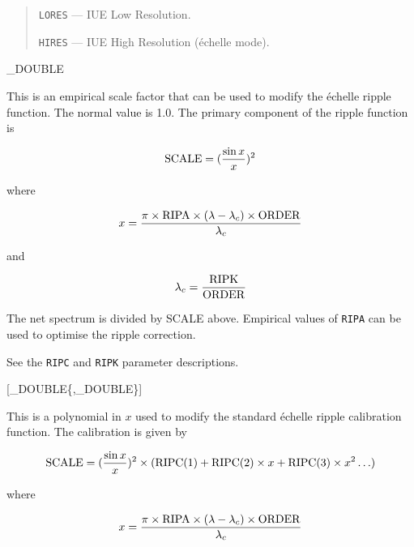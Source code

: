 {{   \begin {quote}
   \begin {description}
      \item {\tt LORES} --- IUE Low Resolution.
      \item {\tt HIRES} --- IUE High Resolution (\'{e}chelle mode).
   \end {description}
   \end {quote}
}

{
   \_DOUBLE
}{
   This is an empirical scale factor that can be used to modify the
   \'{e}chelle ripple function.
   The normal value is 1.0.
   The primary component of the ripple function is

   \begin {equation}
      {\rm SCALE} = (\frac{\sin x}{x})^2
   \end {equation}

   where

   \begin {equation}
      x = \frac{\pi \times {\rm RIPA} \times (\lambda - \lambda_c)
                \times {\rm ORDER}}
               {\lambda_c}
   \end {equation}

   and

   \begin {equation}
      \lambda_c = \frac{\rm RIPK}{\rm ORDER}
   \end {equation}

   The net spectrum is divided by SCALE above.
   Empirical values of \verb+RIPA+ can be used to optimise the ripple
   correction.

   See the \verb+RIPC+ and \verb+RIPK+ parameter descriptions.
}

{
   [\_DOUBLE\{,\_DOUBLE\}]
}{
   This is a polynomial in $x$ used to modify the standard \'{e}chelle
   ripple calibration function.
   The calibration is given by

   \begin {equation}
      {\rm SCALE} = (\frac{\sin x}{x})^2 \times (
                {\rm RIPC}(1) + {\rm RIPC}(2) \times x +
                {\rm RIPC}(3) \times x^2 \ldots)
   \end {equation}

   where

   \begin {equation}
      x = \frac {\pi \times {\rm RIPA} \times (\lambda - \lambda_c) \times
                 {\rm ORDER}}
                {\lambda_c}
   \end {equation}

}}
